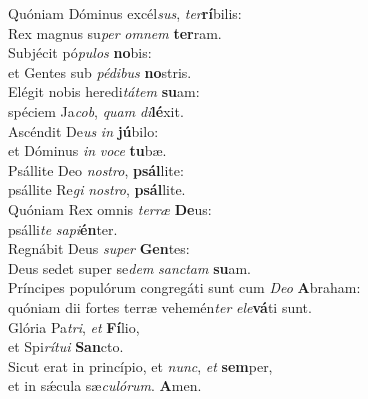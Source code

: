 \evenverse Quóniam Dóminus excél\textit{sus}, \textit{ter}\textbf{rí}bilis:~\*\\
\evenverse Rex magnus su\textit{per} \textit{om}\textit{nem} \textbf{ter}ram.\\
\oddverse Subjécit pó\textit{pu}\textit{los} \textbf{no}bis:~\*\\
\oddverse et Gentes sub \textit{pé}\textit{di}\textit{bus} \textbf{no}stris.\\
\evenverse Elégit nobis heredi\textit{tá}\textit{tem} \textbf{su}am:~\*\\
\evenverse spéciem Ja\textit{cob}, \textit{quam} \textit{di}\textbf{lé}xit.\\
\oddverse Ascéndit De\textit{us} \textit{in} \textbf{jú}bilo:~\*\\
\oddverse et Dóminus \textit{in} \textit{vo}\textit{ce} \textbf{tu}bæ.\\
\evenverse Psállite Deo \textit{no}\textit{stro}, \textbf{psál}lite:~\*\\
\evenverse psállite Re\textit{gi} \textit{no}\textit{stro}, \textbf{psál}lite.\\
\oddverse Quóniam Rex omnis \textit{ter}\textit{ræ} \textbf{De}us:~\*\\
\oddverse psálli\textit{te} \textit{sa}\textit{pi}\textbf{én}ter.\\
\evenverse Regnábit Deus \textit{su}\textit{per} \textbf{Gen}tes:~\*\\
\evenverse Deus sedet super se\textit{dem} \textit{san}\textit{ctam} \textbf{su}am.\\
\oddverse Príncipes populórum congregáti sunt cum \textit{De}\textit{o} \textbf{A}braham:~\*\\
\oddverse quóniam dii fortes terræ vehemén\textit{ter} \textit{e}\textit{le}\textbf{vá}ti sunt.\\
\evenverse Glória Pa\textit{tri}, \textit{et} \textbf{Fí}lio,~\*\\
\evenverse et Spi\textit{rí}\textit{tu}\textit{i} \textbf{San}cto.\\
\oddverse Sicut erat in princípio, et \textit{nunc}, \textit{et} \textbf{sem}per,~\*\\
\oddverse et in sǽcula sæ\textit{cu}\textit{ló}\textit{rum}. \textbf{A}men.\\

